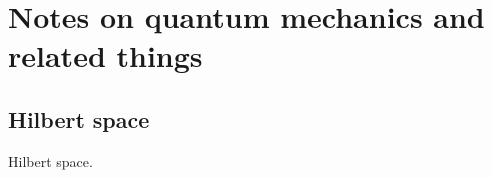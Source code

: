 \section{Notes on quantum mechanics and related things}
\subsection{Hilbert space}
\begin{mydef}
  Hilbert space.
  \end{mydef}
